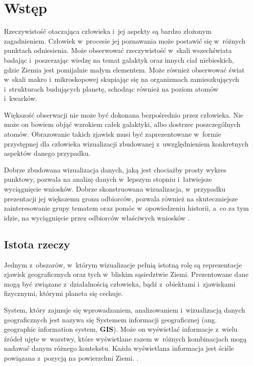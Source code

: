 \chapter{Wstęp}

Rzeczywistość otaczająca człowieka i~jej aspekty są bardzo złożonym zagadnieniem. Człowiek w~procesie jej poznawania może postawić się w~różnych punktach odniesienia. Może obserwować rzeczywistość w~skali wszechświata badając i~poszerzając wiedzę na temat galaktyk oraz innych ciał niebieskich, gdzie Ziemia jest pomijalnie małym elementem. Może również obserwować świat w~skali makro i~mikroskopowej skupiając się na organizmach zamieszkujących i~strukturach budujących planetę, schodząc również na poziom atomów i~kwarków. 

Większość obserwacji nie może być dokonana bezpośrednio przez człowieka. Nie może on bowiem objąć wzrokiem całek galaktyki, albo dostrzec poszczególnych atomów. Obrazowanie takich zjawisk musi być zaprezentowane w~formie przystępnej dla człowieka wizualizacji zbudowanej z~uwzględnieniem konkretnych aspektów danego przypadku. 

Dobrze zbudowana wizualizacja danych, jaką jest chociażby prosty wykres punktowy, pozwala na analizę danych w~lepszym stopniu i~łatwiejsze wyciągnięcie wniosków. Dobrze skonstruowana wizualizacja, w~przypadku prezentacji jej większemu gronu odbiorców, pozwala również na skuteczniejsze zainteresowanie grupy tematem oraz pomóc w~opowiedzeniu historii, a~co za tym idzie, na wyciągnięcie przez odbiorców właściwych wniosków \cite{StorytellingWithData}.

\section{Istota rzeczy}

Jednym z~obszarów, w~którym wizualizacje pełnią istotną rolę są reprezentacje zjawisk geograficznych oraz tych w~bliskim sąsiedztwie Ziemi. Prezentowane dane mogą być związane z~działalnością człowieka, bądź z~obiektami i~zjawiskami fizycznymi, którymi planeta się cechuje.

System, który zajmuje się wprowadzaniem, analizowaniem i~wizualizacją danych geograficznych jest nazywa się Systemem informacji geograficznej (ang. geographic information system, \textbf{GIS}). Może on wyświetlać informacje z~wielu źródeł ujęte w~warstwy, które wyświetlane razem w~różnych kombinacjach mogą nadawać danym różnego kontekstu. Każda wyświetlana informacja jest ściśle powiązana z~pozycją na powierzchni Ziemi. \cite[Rozdział 1.6]{IntroductionToHumanGeography}.

